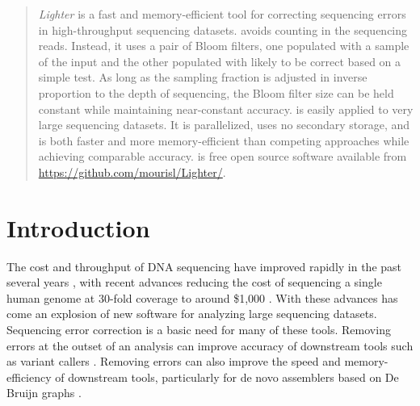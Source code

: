 \documentclass{bmcart}
\begin{document}
\begin{abstract}
\emph{Lighter} is a fast and memory-efficient tool for correcting sequencing errors in high-throughput sequencing datasets.
\tool avoids counting \kmers in the sequencing reads.
Instead, it uses a pair of Bloom filters, one populated with a sample of the input \kmers and the other populated with \kmers likely to be correct based on a simple test.
As long as the sampling fraction is adjusted in inverse proportion to the depth of sequencing, the Bloom filter size can be held constant while maintaining near-constant accuracy.
\tool is easily applied to very large sequencing datasets.
It is parallelized, uses no secondary storage, and is both faster and more memory-efficient than competing approaches while achieving comparable accuracy.
\tool is free open source software available from \url{https://github.com/mourisl/Lighter/}.
\end{abstract}



\section*{Introduction}
The cost and throughput of DNA sequencing have improved rapidly in the past several years \cite{glenn2011field}, with recent advances reducing the cost of sequencing a single human genome at 30-fold coverage to around \$1,000 \cite{1kgenomeforreal}.
With these advances has come an explosion of new software for analyzing large sequencing datasets.
Sequencing error correction is a basic need for many of these tools.
Removing errors at the outset of an analysis can improve accuracy of downstream tools such as variant callers \cite{kelley2010quake}.
Removing errors can also improve the speed and memory-efficiency of downstream tools, particularly for de novo assemblers based on De Bruijn graphs  \cite{pevzner2001eulerian, chaisson2004fragment}.
\end{document}
